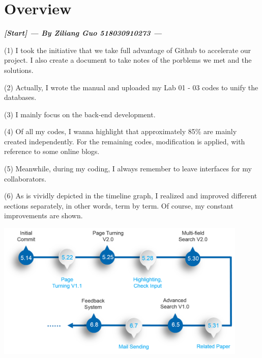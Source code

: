 \documentclass[10pt,twoside,a4paper,titlepage]{article}
\begin{document}
	\section{Overview}
		\textbf{\emph{[Start] --- By Ziliang Guo 518030910273 ---}}\newline\par
		(1) I took the initiative that we take full advantage of Github to accelerate our project. I also create a document to take notes of the porblems we met and the solutions.\newline\par
		(2) Actually, I wrote the manual and uploaded my Lab 01 - 03 codes to unify the databases.\newline\par
		(3)	I mainly focus on the back-end development.\newline\par
		(4) Of all my codes, I wanna highlight that approximately 85\% are mainly created  independently. For the remaining codes, modification is applied, with reference to some online blogs.\newline\par
		(5) Meanwhile, during my coding, I always remember to leave interfaces for my collaborators.\newline\par
		(6)	As is vividly depicted in the timeline graph, I realized and improved different sections separately, in other words, term by term. Of course, my constant improvements are shown.\newline\par
		\includegraphics[width=0.9\textwidth]{gzl/01.png}
\end{document}
